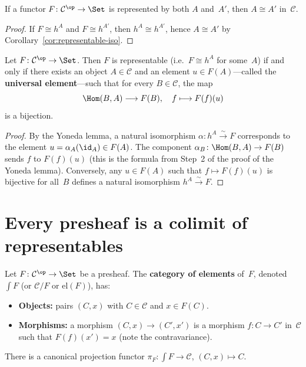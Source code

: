 \begin{corollary}%
\label{cor:rep-unique}
If a functor $F\colon\mathcal{C}^{\op}\to\Set$ is represented by both
$A$ and~$A'$, then $A\cong A'$ in~$\mathcal{C}$.
\end{corollary}

\begin{proof}
If $F\cong h^A$ and $F\cong h^{A'}$, then $h^A\cong h^{A'}$, hence
$A\cong A'$ by Corollary~\ref{cor:representable-iso}.
\end{proof}

\begin{corollary}\label{cor:yoneda-universal-element}
Let $F\colon\mathcal{C}^{\op}\to\Set$.  Then $F$ is representable
(i.e.\ $F\cong h^A$ for some~$A$) if and only if there exists an object
$A\in\mathcal{C}$ and an element $u\in F(A)$---called the
\textbf{universal element}---such that for every $B\in\mathcal{C}$, the map
\[
    \Hom(B,A) \longrightarrow F(B), \quad f\longmapsto F(f)(u)
\]
is a bijection.
\end{corollary}

\begin{proof}
By the Yoneda lemma, a natural isomorphism $\alpha\colon h^A\xrightarrow{\sim} F$
corresponds to the element $u = \alpha_A(\id_A)\in F(A)$.
The component $\alpha_B\colon\Hom(B,A)\to F(B)$ sends $f$ to
$F(f)(u)$ (this is the formula from Step~2 of the proof of the
Yoneda lemma).  Conversely, any $u\in F(A)$ such that $f\mapsto F(f)(u)$
is bijective for all~$B$ defines a natural isomorphism
$h^A\xrightarrow{\sim}F$.
\end{proof}


\section{Every presheaf is a colimit of representables}%
\label{sec:colim-representables}

\begin{definition}\label{def:category-of-elements}
Let $F\colon\mathcal{C}^{\op}\to\Set$ be a presheaf.
The \textbf{category of elements} of~$F$, denoted $\int F$
(or $\mathcal{C}/F$ or $\mathrm{el}(F)$), has:
\begin{itemize}
\item \textbf{Objects:} pairs $(C,x)$ with $C\in\mathcal{C}$ and $x\in F(C)$.
\item \textbf{Morphisms:} a morphism $(C,x)\to(C',x')$ is a morphism
    $f\colon C\to C'$ in~$\mathcal{C}$ such that $F(f)(x') = x$
    (note the contravariance).
\end{itemize}
There is a canonical projection functor
$\pi_F\colon\int F\to\mathcal{C}$, $(C,x)\mapsto C$.
\end{definition}

